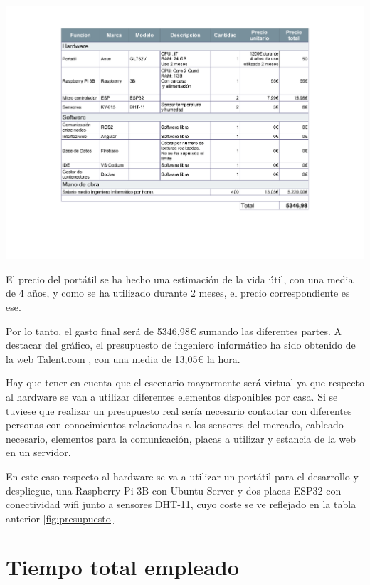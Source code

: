 \begin{center}
    \centering
    \includegraphics[width=\textwidth]{img/04-Presupuesto.pdf}
    \label{fig:presupuesto}
\end{center}

El precio del portátil se ha hecho una estimación de la vida útil, con una media de 4 años, y como se ha utilizado durante 2 meses, el precio correspondiente es ese.

Por lo tanto, el gasto final será de 5346,98€ sumando las diferentes partes. A destacar del gráfico, el presupuesto de ingeniero informático ha sido obtenido de la web Talent.com \cite{salario}, con una media de 13,05€ la hora.

Hay que tener en cuenta que el escenario mayormente será virtual ya que respecto al hardware se van a utilizar diferentes elementos disponibles por casa. Si se tuviese que realizar un presupuesto real sería necesario contactar con diferentes personas con conocimientos relacionados a los sensores del mercado, cableado necesario, elementos para la comunicación, placas a utilizar y estancia de la web en un servidor.

En este caso respecto al hardware se va a utilizar un portátil para el desarrollo y despliegue, una Raspberry Pi 3B con Ubuntu Server y dos placas ESP32 con conectividad wifi junto a sensores DHT-11, cuyo coste se ve reflejado en la tabla anterior \ref{fig:presupuesto}.

\section{Tiempo total empleado}

